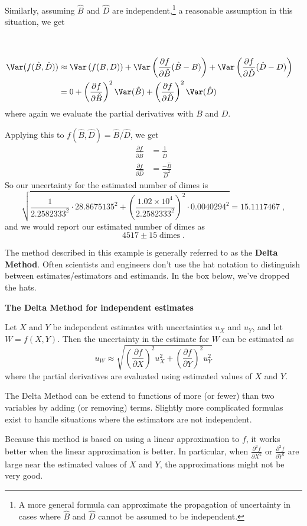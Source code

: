 \documentclass[twoside]{book}\usepackage[]{graphicx}\usepackage[]{xcolor}
\def\myindex#1{\index{#1}}
\def\term#1{\textbf{#1}}
\newlength{\tempfmlength}
\newenvironment{fmpage}[1]
     {
	 \medskip
	 \setlength{\tempfmlength}{#1}
	 \begin{lrbox}{\fmbox}
	   \begin{minipage}{#1}
		 \vspace*{.02\tempfmlength}
		 \hfill
	   \begin{minipage}{.95 \tempfmlength}}
		 {\end{minipage}\hfill
		 \vspace*{.015\tempfmlength}
		 \end{minipage}\end{lrbox}\fbox{\usebox{\fmbox}}
	 \medskip
	 }
\newenvironment{boxedText}[1][.98\textwidth]%
{%
\begin{center}
\begin{fmpage}{#1}
}%
{%
\end{fmpage}
\end{center}
}
\newcounter{example}[section]
\begin{document}
Similarly, 
assuming $\hat B$ and $\hat D$ are independent,\footnote{A more general formula
can approximate the propagation of uncertainty in cases where $\hat B$ and $\hat D$ 
cannot be assumed to be independent.} a reasonable assumption in this situation,
we get
\begin{align*}
	\\[5mm]
\Var(f(\hat B,\hat D))
&\approx 
\Var\left(f( B, D)\right)
+
\Var\left( \frac{\partial f}{\partial \hat B} (\hat B - B) \right)
+
\Var\left( \frac{\partial f}{\partial \hat D} (\hat D - D) \right)
\\
&=
0 
+
\left(\frac{\partial f}{\partial \hat B}\right)^2 \Var(\hat B)
+
\left(\frac{\partial f}{\partial \hat D}\right)^2 \Var(\hat D)
\end{align*}
where again we evaluate the partial derivatives with $B$ and $D$.

Applying this to $f(\hat B,\hat D) = \hat B/\hat D$, we get
\begin{align*}
	\frac{\partial f}{\partial \hat B} &= \frac{1}{\hat D}
	\\
	\frac{\partial f}{\partial \hat D} &= \frac{-\hat B}{\hat D^2}
\end{align*}
So our uncertainty for the estimated number of dimes is
\[
\sqrt{
\frac{1}{2.2582333^2} \cdot 28.8675135^2 
+ \left(\frac{\ensuremath{1.02\times 10^{4}}}{2.2582333^2}\right)^2 \cdot 0.0040294^2}
=
15.1117467 \;,
\]
and we would report our estimated number of dimes as 
\[ 
4517 \pm 15 \; \mbox{dimes} \;.
\]

\myindex{Delta Method|defidx}%
The method described in this example is generally referred to as the
\term{Delta Method}.  Often scientists and engineers don't use the hat notation
to distinguish between estimates/estimators and estimands.  In the box below, we've 
dropped the hats.

\begin{boxedText}
	\centerline{\textsf{\bfseries The Delta Method for independent estimates}}

	\medskip

	Let $X$ and $Y$ be independent estimates with uncertainties $u_{X}$ and $u_{Y}$,  
	and let $W = f(X,Y)$.
	Then the uncertainty in the estimate for $W$ can be estimated as 
	\[
	u_{W} \approx
	\sqrt{ 
\left(\frac{\partial f}{\partial X}\right)^2 u_X^2
+
\left(\frac{\partial f}{\partial Y}\right)^2 u_Y^2
	}
	\]
	where the partial derivatives are evaluated using estimated values of $X$ and $Y$.

	\medskip

	The Delta Method can be extend to functions of more (or fewer) than two variables by
	adding (or removing) terms.  Slightly more complicated formulas exist to handle
	situations where the estimators are not independent.

	\medskip
	Because this method is based on using a linear approximation to $f$, it works better
	when the linear approximation is better.  In particular, when
	$\frac{\partial^2 f}{\partial X^2}$ or
	$\frac{\partial^2 f}{\partial Y^2}$ are large near the estimated 
	values of $X$ and $Y$, the approximations might not be very good.
\end{boxedText}
\end{document}
